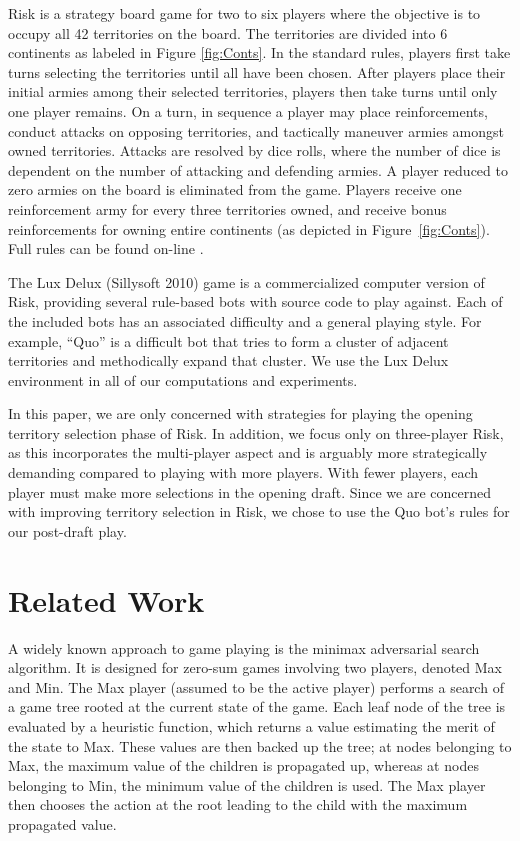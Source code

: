 \documentclass[letterpaper]{article}
\numberwithin{equation}{section}
\numberwithin{theorem}{section}
\numberwithin{lemma}{section}
\numberwithin{df}{section}
\begin{document}
Risk is a strategy board game for two to six players where the objective is to occupy all 42 territories on the board.  The territories are divided into 6 continents as labeled in Figure \ref{fig:Conts}.  In the standard rules, players first take turns selecting the territories until all have been chosen.  After players place their initial armies among their selected territories, players then take turns until only one player remains.  On a turn, in sequence a player may place reinforcements, conduct attacks on opposing territories, and tactically maneuver armies amongst owned territories.  Attacks are resolved by dice rolls, where the number of dice is dependent on the number of attacking and defending armies.  A player reduced to zero armies on the board is eliminated from the game.  Players receive one reinforcement army for every three territories owned, and receive bonus reinforcements for owning entire continents (as depicted in Figure~\ref{fig:Conts}). %
Full rules can be found on-line \cite{Risk}.

The Lux Delux (Sillysoft 2010) \nocite{Lux} %
game is a commercialized computer version of Risk, providing several rule-based bots with source code to play against.  Each of the included bots has an associated difficulty and a general playing style.  For example, ``Quo'' is a difficult bot that tries to form a cluster of adjacent territories and methodically expand that cluster.  We use the Lux Delux environment in all of our computations and experiments.  

In this paper, we are only concerned with strategies for playing the opening territory selection phase of Risk.  In addition, we focus only on three-player Risk, as this incorporates the multi-player aspect and is arguably more strategically demanding compared to playing with more players.  With fewer players, each player must make more selections in the opening draft.  Since we are concerned with improving territory selection in Risk, we chose to use the Quo bot's rules for our post-draft play. 

\section{Related Work}

A widely known approach to game playing is the minimax adversarial search algorithm.  It is designed for zero-sum games involving two players, denoted Max and Min.  The Max player (assumed to be the active player) performs a search of a game tree rooted at the current state of the game.  Each leaf node of the tree is evaluated by a heuristic function, which returns a value estimating the merit of the state to Max.  These values are then backed up the tree; at nodes belonging to Max, the maximum value of the children is propagated up, whereas at nodes belonging to Min, the minimum value of the children is used.  The Max player then chooses the action at the root leading to the child with the maximum propagated value.
\end{document}

